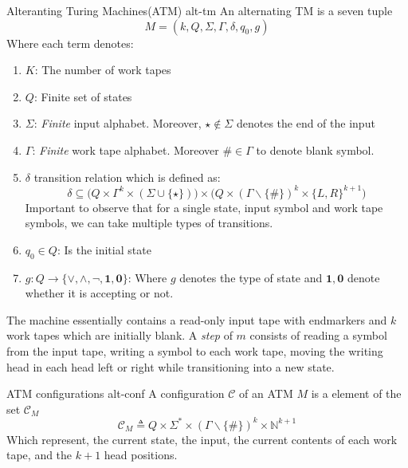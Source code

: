 \begin{definitionbox}{Alteranting Turing Machines(ATM) \cite{kozen_TheoryComputation_2006, chandra1981alternation}}{alt-tm}
    \label{def:alt-tm}
    An alternating TM is a seven tuple
    $$
        M = (k , Q, \Sigma, \Gamma, \delta, q_0, g)
    $$
    Where each term denotes:
    \begin{enumerate}
        \item $K$: The number of work tapes
        \item $Q$: Finite set of states
        \item $\Sigma$: \textit{Finite} input alphabet. Moreover, $\star \not\in \Sigma$ denotes the end of the input
        \item $\Gamma$: \textit{Finite} work tape alphabet. Moreover $\# \in \Gamma$ to denote blank symbol.
        \item $\delta$ transition relation which is defined as:
              $$
                  \delta \subseteq \Big(Q \times \Gamma^k \times (\Sigma \cup \{\star\}) \Big)\times
                  \Big(Q \times (\Gamma \smallsetminus \{\#\})^k \times \{L, R\}^{k+1} \Big)
              $$
              Important to observe that for a single state, input symbol and work tape symbols, we can take multiple types of transitions.
        \item $q_0 \in Q$: Is the initial state
        \item $g : Q \to \{\vee, \wedge, \neg , \textbf{1}, \textbf{0}\}$: Where $g$ denotes the type of state
              and $\mathbf{1}, \mathbf{0}$  denote whether it is accepting or not.

    \end{enumerate}

\end{definitionbox}

The machine essentially contains a read-only input tape with endmarkers and $k$ work tapes which are
initially blank. A \textit{step} of $m$ consists of reading a symbol from the input tape,
writing a symbol to each work tape, moving the writing head in each head left or right
while transitioning into a new state.

\begin{definitionbox}{ATM configurations \cite{kozen_TheoryComputation_2006, chandra1981alternation}}{alt-conf}
    \label{def:alt-conf}
    A configuration $\mathcal{C}$ of an ATM $M$ is a element of the set $\mathcal{C}_M$
    $$
        \mathcal{C}_M \triangleq Q \times \Sigma^* \times (\Gamma \smallsetminus \{\#\})^k \times \mathbb{N}^{k+1}
    $$
    Which represent, the current state, the input, the current contents of each work tape, and the $k+1$ head positions.
\end{definitionbox}

